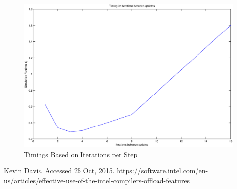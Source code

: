 \documentclass{article}
\begin{document}
\begin{figure}[here]
 \centering
 \includegraphics[width=0.9\linewidth]{t_iter.eps}
 \caption{Timings Based on Iterations per Step}
 \label{fig:niter}
\end{figure}



\begin{thebibliography}{1}
Kevin Davis. Accessed 25 Oct, 2015. https://software.intel.com/en-us/articles/effective-use-of-the-intel-compilers-offload-features

\end{thebibliography}
\end{document}
